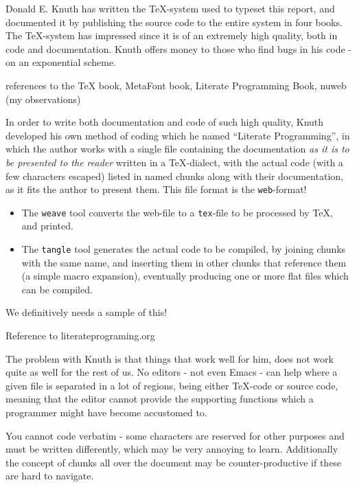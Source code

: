 Donald E. Knuth has written the {\TeX}-system used to typeset this
report, and documented it by publishing the source code to the entire
system in four books.  The {\TeX}-system has impressed since it is of
an extremely high quality, both in code and documentation.
\textsf{Knuth offers money to those who find bugs in his code - on an
  exponential scheme}.

\textsf{references to the TeX book, MetaFont book, Literate
  Programming Book, nuweb (my observations)}

In order to write both documentation and code of such high quality,
Knuth developed his own method of coding \textsf{which he named
``Literate Programming''}, in which the author works with a single
file containing the documentation \textit{as it is to be presented to
the reader} written in a {\TeX}-dialect, with the actual code (with a
few characters escaped) listed in named chunks along with their
documentation, as it fits the author to present them.  This file
format is the \texttt{web}-format!

\begin{itemize}
\item 
The \texttt{weave} tool converts the web-file to a \texttt{tex}-file
to be processed by {\TeX}, and printed.

\item The \texttt{tangle} tool generates the actual code to be
compiled, by joining chunks with the same name, and inserting them in
other chunks that reference them (a simple macro expansion),
eventually producing one or more flat files which can be compiled.

\end{itemize}

\textsf{We definitively needs a sample of this!}

\textsf{Reference to literateprograming.org}

The problem with Knuth is that things that work well for him, does not
work quite as well for the rest of us.   No editors - not even Emacs -
can help where a given file is separated in a lot of regions, being 
either {\TeX}-code or source code, meaning that the editor cannot
provide the supporting functions which a programmer might have become
accustomed to.

You cannot code verbatim - some characters are reserved for other
purposes and must be written differently, which may be very annoying
to learn.  Additionally the concept of chunks all over the document
may be counter-productive if these are hard to navigate.

